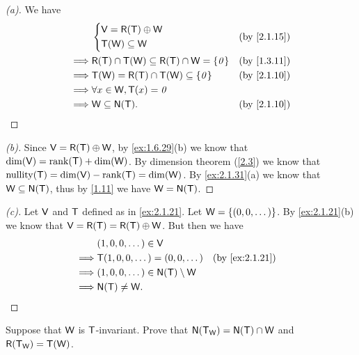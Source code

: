 \begin{proof}[(a)]
  We have
  \begin{align*}
             & \begin{dcases}
                 \V = \rg{\T} \oplus \W \\
                 \T(\W) \subseteq \W
               \end{dcases}                                 &  & \text{(by \cref{2.1.15})}              \\
    \implies & \rg{\T} \cap \T(\W) \subseteq \rg{\T} \cap \W = \set{\zv} &  & \text{(by \cref{1.3.11})} \\
    \implies & \T(\W) = \rg{\T} \cap \T(\W) \subseteq \set{\zv}          &  & \text{(by \cref{2.1.10})} \\
    \implies & \forall x \in \W, \T(x) = \zv                                                            \\
    \implies & \W \subseteq \ns{\T}.                                     &  & \text{(by \cref{2.1.10})}
  \end{align*}
\end{proof}

\begin{proof}[(b)]
  Since \(\V = \rg{\T} \oplus \W\), by \cref{ex:1.6.29}(b) we know that \(\dim(\V) = \rk{\T} + \dim(\W)\).
  By dimension theorem (\cref{2.3}) we know that \(\nt{\T} = \dim(\V) - \rk{\T} = \dim(\W)\).
  By \cref{ex:2.1.31}(a) we know that \(\W \subseteq \ns{\T}\), thus by \cref{1.11} we have \(\W = \ns{\T}\).
\end{proof}

\begin{proof}[(c)]
  Let \(\mathsf{V}\) and \(\mathsf{T}\) defined as in \cref{ex:2.1.21}.
  Let \(\mathsf{W} = \left\lbrace(0, 0, \dots)\right\rbrace\).
  By \cref{ex:2.1.21}(b) we know that \(\V = \rg{\T} = \rg{\T} \oplus \W\).
  But then we have
  \begin{align*}
             & (1, 0, 0, \dots) \in \V                                                     \\
    \implies & \T(1, 0, 0, \dots) = (0, 0, \dots)        &  & \text{(by \cref{ex:2.1.21})} \\
    \implies & (1, 0, 0, \dots) \in \ns{\T} \setminus \W                                   \\
    \implies & \ns{\T} \neq \W.
  \end{align*}
\end{proof}

\begin{ex}\label{ex:2.1.32}
  Suppose that \(\mathsf{W}\) is \(\mathsf{T}\)-invariant.
  Prove that \(\ns{\T_{\W}} = \ns{\T} \cap \W\) and \(\rg{\T_{\W}} = \T(\W)\).
\end{ex}

